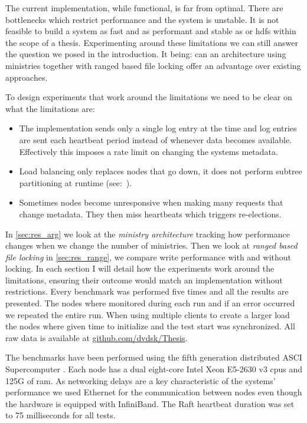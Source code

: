 The current implementation, while functional, is far from optimal. There are bottlenecks which restrict performance and the system is unstable. It is not feasible to build a system as fast and as performant and stable as \ceph{} or \ac{hdfs} within the scope of a thesis. Experimenting around these limitations we can still answer the question we posed in the introduction. It being: can an architecture using ministries together with ranged based file locking offer an advantage over existing approaches.

To design experiments that work around the limitations we need to be clear on what the limitations are:

\begin{itemize}
	\item The \raft{} implementation sends only a single log entry at the time and log entries are sent each heartbeat period instead of whenever data becomes available. Effectively this imposes a rate limit on changing the systems metadata.
	\item Load balancing only replaces nodes that go down, it does not perform subtree partitioning at runtime (see:~).
	\item Sometimes nodes become unresponsive when making many requests that change metadata. They then miss heartbeats which triggers re-elections.
\end{itemize}

In \cref{sec:res_arg} we look at the \textit{ministry architecture} tracking how performance changes when we change the number of ministries. Then we look at \textit{ranged based file locking} in \cref{sec:res_range}, we compare write performance with and without locking. In each section I will detail how the experiments work around the limitations, ensuring their outcome would match an implementation without restrictions. Every benchmark was performed five times and all the results are presented. The nodes where monitored during each run and if an error occurred we repeated the entire run. When using multiple clients to create a larger load the nodes where given time to initialize and the test start was synchronized. All raw data is available at \href{https://github.com/dvdsk/Thesis}{github.com/dvdsk/Thesis}.

The benchmarks have been performed using the fifth generation distributed ASCI Supercomputer \cite{das5}. Each node has a dual eight-core Intel Xeon E5-2630 v3 cpus and 125G of ram. As networking delays are a key characteristic of the systems' performance we used Ethernet for the communication between nodes even though the hardware is equipped with InfiniBand. The Raft heartbeat duration was set to 75 milliseconds for all tests.

